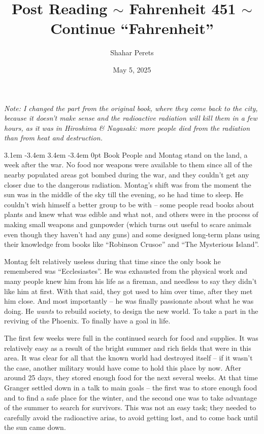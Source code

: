 \documentclass[]{article}
\author{Shahar Perets}
\title{Post Reading $\sim$ {\huge \frakfamily Fahrenheit 451} $\sim$ Continue ``Fahrenheit''}
\date{May 5, 2025}
\def\pstart#1{\noindent\smash{\lower3ex\hbox{\llap{\Huge\gothfamily#1}}}
    \parshape=3 3.1em \dimexpr\hsize-3.4em 3.4em \dimexpr\hsize-3.4em 0pt \hsize}
\begin{document}
	\maketitle
	
    \small \textit{Note: I changed the part from the original book, where they come back to the city, because it doesn't make sense and the radioactive radiation will kill them in a few hours, as it was in Hiroshima \& Nagasaki: more people died from the radiation than from heat and destruction. }
    
    \normalsize\pstart{The}\!\! Book People and Montag stand on the land, a week after the war. No food nor weapons were available to them since all of the nearby populated areas got bombed during the war, and they couldn't get any closer due to the dangerous radiation. Montag's shift was from the moment the sun was in the middle of the sky till the evening, so he had time to sleep. He couldn't wish himself a better group to be with -- some people read books about plants and knew what was edible and what not, and others were in the process of making small weapons and gunpowder (which turns out useful to scare animals even though they haven't had any guns) and some designed long-term plans using their knowledge from books like ``Robinson Crusoe'' and ``The Mysterious Island''. 
    
    Montag felt relatively useless during that time since the only book he remembered was ``Ecclesiastes''. He was exhausted from the physical work and many people knew him from his life as a fireman, and needless to say they didn't like him at first. With that said, they got used to him over time, after they met him close. And most importantly -- he was finally passionate about what he was doing. He \textit{wants} to rebuild society, to design the new world. To take a part in the reviving of the Phoenix. To finally have a goal in life. 
    
    The first few weeks were full in the continued search for food and supplies. It was relatively easy as a result of the bright summer and rich fields that were in this area. It was clear for all that the known world had destroyed itself -- if it wasn't the case, another military would have come to hold this place by now. After around 25 days, they stored enough food for the next several weeks. At that time Granger settled down in a talk to main goals -- the first was to store enough food and to find a safe place for the winter, and the second one was to take advantage of the summer to search for survivors. This was not an easy task; they needed to carefully avoid the radioactive arias, to avoid getting lost, and to come back until the sun came down. 
    
\end{document}
